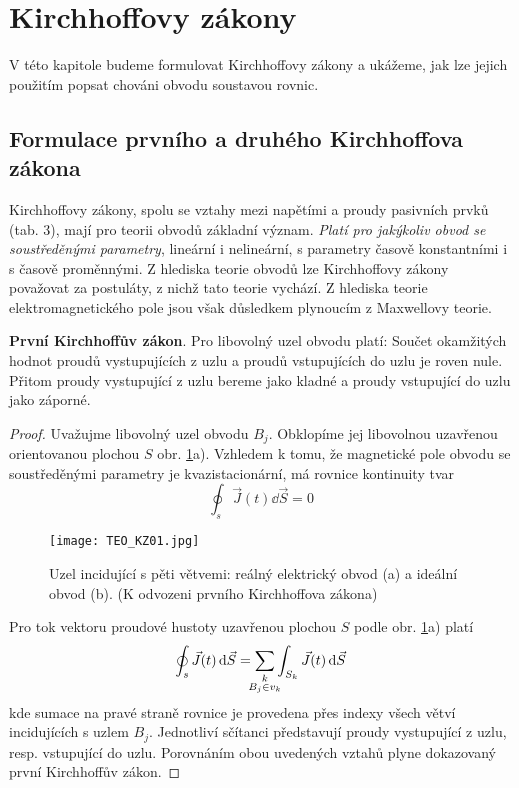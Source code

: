 {  \section{Kirchhoffovy zákony}
    V této kapitole budeme formulovat Kirchhoffovy zákony a ukážeme, jak lze jejich použitím popsat 
    chováni obvodu soustavou rovnic.
    
    \subsection{Formulace prvního a druhého Kirchhoffova zákona}
      Kirchhoffovy zákony, spolu se vztahy mezi napětími a proudy pasivních prvků (tab. 3), mají 
      pro teorii obvodů základní význam. \emph{Platí pro jakýkoliv obvod se soustředěnými 
      parametry}, lineární i nelineární, s parametry časově konstantními i s časově proměnnými. Z 
      hlediska teorie obvodů lze Kirchhoffovy zákony považovat za postuláty, z nichž tato teorie 
      vychází. Z hlediska teorie elektromagnetického pole jsou však důsledkem plynoucím z 
      Maxwellovy teorie.
      
      \textbf{První Kirchhoffův zákon}. Pro libovolný uzel obvodu platí: Součet okamžitých hodnot 
      proudů vystupujících z uzlu a proudů vstupujících do uzlu je roven nule. Přitom proudy 
      vystupující z uzlu bereme jako kladné a proudy vstupující do uzlu jako záporné.
      
      \begin{proof}
        Uvažujme libovolný uzel obvodu \(B_j\). Obklopíme jej libovolnou uzavřenou orientovanou 
        plochou \(S\) obr. \ref{TEO:fig_KZ01}a). Vzhledem k tomu, že magnetické pole obvodu se 
        soustředěnými parametry je kvazistacionární, má rovnice kontinuity tvar
        \begin{equation}
          \oint_s \vec{J}(t)\dd{\vec{S}} = 0
        \end{equation}
        \begin{figure}[ht!]
          \centering
          \texttt{[image: TEO\_KZ01.jpg]}
          \caption{Uzel incidující s pěti větvemi: reálný elektrický obvod (a) a ideální obvod (b). 
                   (K odvozeni prvního Kirchhoffova zákona) \cite[s.~47]{Meyer1978}}
          \label{TEO:fig_KZ01}
        \end{figure}      
        Pro tok vektoru proudové hustoty uzavřenou plochou \(S\) podle obr. \ref{TEO:fig_KZ01}a) 
        platí
        \begin{equation}
          \oint_s \vec{J}(t)\dd{\vec{S}} = \sum_{\mathclap{\substack{k\\B_j\in v_k}}}
                                           \int_{S_k} \vec{J}(t)\dd{\vec{S}} 
        \end{equation}
        kde sumace na pravé straně rovnice je provedena přes indexy všech větví incidujících s 
        uzlem \(B_j\). Jednotliví sčítanci představují proudy vystupující z uzlu, resp. vstupující 
        do uzlu. Porovnáním obou uvedených vztahů plyne dokazovaný první Kirchhoffův zákon.
      \end{proof}
      
}
